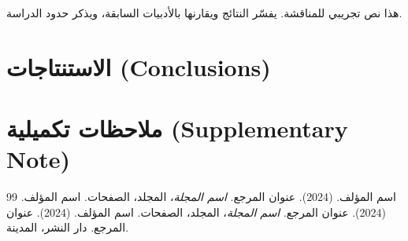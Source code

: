 \documentclass[11pt,a4paper]{article}
\begin{document}
هذا نص تجريبي للمناقشة. يفسّر النتائج ويقارنها بالأدبيات السابقة، ويذكر حدود الدراسة.

\section{الاستنتاجات (Conclusions)}
\label{sec:conclusion}


\section*{ملاحظات تكميلية (Supplementary Note)}


\begin{thebibliography}{99}
 اسم المؤلف. (2024). عنوان المرجع. \emph{اسم المجلة}، المجلد، الصفحات.
 اسم المؤلف. (2024). عنوان المرجع. \emph{اسم المجلة}، المجلد، الصفحات.
 اسم المؤلف. (2024). عنوان المرجع. دار النشر، المدينة.
\end{thebibliography}
\end{document}
